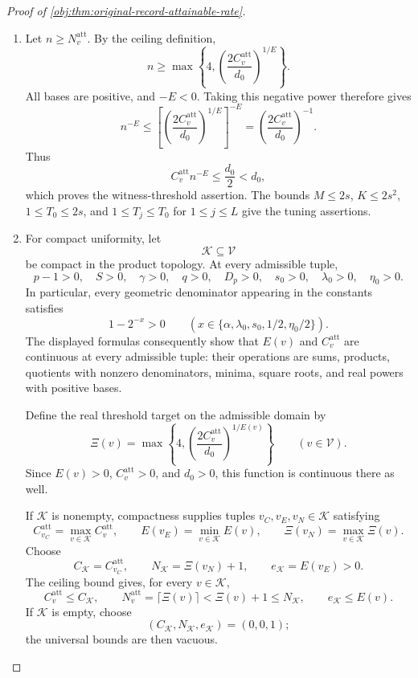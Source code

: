 \begin{proof}[Proof of \cref{obj:thm:original-record-attainable-rate}]
\begin{enumerate}
\item Let \(n\ge N^{\mathrm{att}}_v\). By the ceiling definition,
\[
n\ge
\max\left\{4,
\left(\frac{2C^{\mathrm{att}}_v}{d_0}\right)^{1/E}\right\}.
\]
All bases are positive, and \(-E<0\). Taking this negative power therefore gives
\[
n^{-E}
\le
\left[
\left(\frac{2C^{\mathrm{att}}_v}{d_0}\right)^{1/E}
\right]^{-E}
=\left(\frac{2C^{\mathrm{att}}_v}{d_0}\right)^{-1}.
\]
Thus
\[
C^{\mathrm{att}}_v n^{-E}
\le\frac{d_0}{2}<d_0,
\]
which proves the witness-threshold assertion. The bounds \(M\le2s\), \(K\le2s^2\), \(1\le T_0\le2s\), and \(1\le T_j\le T_0\) for \(1\le j\le L\) give the tuning assertions.

\item For compact uniformity, let
\[
\mathcal K\subseteq\mathcal V
\]
be compact in the product topology. At every admissible tuple,
\[
p-1>0,\quad S>0,\quad\gamma>0,\quad q>0,\quad D_p>0,
\quad s_0>0,\quad\lambda_0>0,\quad\eta_0>0.
\]
In particular, every geometric denominator appearing in the constants satisfies
\[
1-2^{-x}>0
\qquad
\left(
x\in
\{\alpha,\lambda_0,s_0,1/2,\eta_0/2\}
\right).
\]
The displayed formulas consequently show that \(E(v)\) and
\(C^{\mathrm{att}}_v\) are continuous at every admissible tuple: their operations are sums, products, quotients with nonzero denominators, minima, square roots, and real powers with positive bases.

Define the real threshold target on the admissible domain by
\[
\Xi(v)
=\max\left\{4,
\left(\frac{2C^{\mathrm{att}}_v}{d_0}\right)^{1/E(v)}
\right\}
\qquad(v\in\mathcal V).
\]
Since \(E(v)>0\), \(C^{\mathrm{att}}_v>0\), and \(d_0>0\), this function is continuous there as well.

If \(\mathcal K\) is nonempty, compactness supplies tuples
\(v_C,v_E,v_N\in\mathcal K\) satisfying
\[
C^{\mathrm{att}}_{v_C}
=\max_{v\in\mathcal K}C^{\mathrm{att}}_v,
\qquad
E(v_E)=\min_{v\in\mathcal K}E(v),
\qquad
\Xi(v_N)=\max_{v\in\mathcal K}\Xi(v).
\]
Choose
\[
C_{\mathcal K}=C^{\mathrm{att}}_{v_C},
\qquad
N_{\mathcal K}=\Xi(v_N)+1,
\qquad
e_{\mathcal K}=E(v_E)>0.
\]
The ceiling bound gives, for every \(v\in\mathcal K\),
\[
C^{\mathrm{att}}_v\le C_{\mathcal K},
\qquad
N^{\mathrm{att}}_v=\lceil\Xi(v)\rceil
<\Xi(v)+1\le N_{\mathcal K},
\qquad
e_{\mathcal K}\le E(v).
\]
If \(\mathcal K\) is empty, choose
\[
(C_{\mathcal K},N_{\mathcal K},e_{\mathcal K})=(0,0,1);
\]
the universal bounds are then vacuous.


\end{enumerate}
\end{proof}
